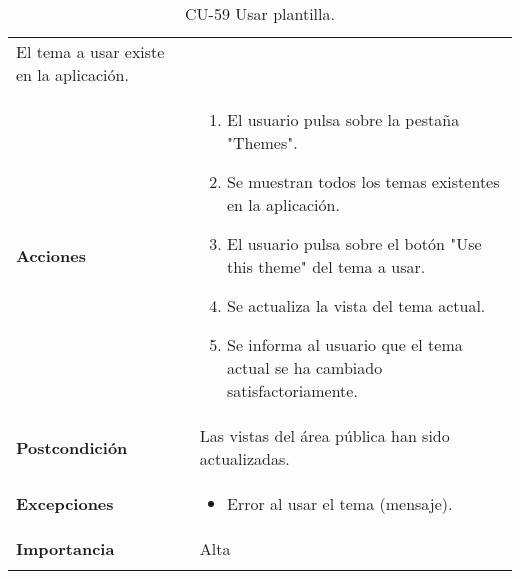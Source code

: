 \begin{longtable}[]{@{}ll@{}}
\begin{minipage}[t]{0.71\columnwidth}
El tema a usar existe en la aplicación.\strut
\end{minipage}\tabularnewline
\begin{minipage}[t]{0.23\columnwidth}\raggedright
\textbf{Acciones}\strut
\end{minipage} & \begin{minipage}[t]{0.71\columnwidth}\raggedright
\begin{enumerate}
\def\labelenumi{\arabic{enumi}.}
\tightlist
\item
  El usuario pulsa sobre la pestaña "Themes".
\item
  Se muestran todos los temas existentes en la aplicación.
\item
  El usuario pulsa sobre el botón "Use this theme" del tema a usar.
\item
  Se actualiza la vista del tema actual.
\item
  Se informa al usuario que el tema actual se ha cambiado
  satisfactoriamente.
\end{enumerate}\strut
\end{minipage}\tabularnewline
\begin{minipage}[t]{0.23\columnwidth}\raggedright
\textbf{Postcondición}\strut
\end{minipage} & \begin{minipage}[t]{0.71\columnwidth}\raggedright
Las vistas del área pública han sido actualizadas.\strut
\end{minipage}\tabularnewline
\begin{minipage}[t]{0.23\columnwidth}\raggedright
\textbf{Excepciones}\strut
\end{minipage} & \begin{minipage}[t]{0.71\columnwidth}\raggedright
\begin{itemize}
\tightlist
\item
  Error al usar el tema (mensaje).
\end{itemize}\strut
\end{minipage}\tabularnewline
\begin{minipage}[t]{0.23\columnwidth}\raggedright
\textbf{Importancia}\strut
\end{minipage} & \begin{minipage}[t]{0.71\columnwidth}\raggedright
Alta\strut
\end{minipage}\tabularnewline
\bottomrule
\caption{CU-59 Usar plantilla.}
\end{longtable}

